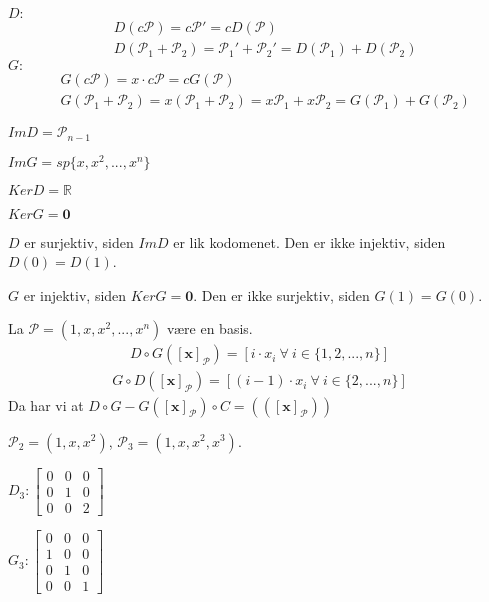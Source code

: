 \documentclass[11pt, a4paper, norsk]{NTNUoving}
\begin{document}
\begin{oppgave}[4]
\begin{punkt}
    $D:$
    \begin{align*}
        &D(c\mathcal{P})=c\mathcal{P}'=cD(\mathcal{P})
        \\&D(\mathcal{P}_1+\mathcal{P}_2)=\mathcal{P}_1'+\mathcal{P}_2'=D(\mathcal{P}_1)+D(\mathcal{P}_2)
    \end{align*}
    $G:$
    \begin{align*}
        &G(c\mathcal{P})=x\cdot c\mathcal{P} = cG(\mathcal{P})
        \\&G(\mathcal{P}_1+\mathcal{P}_2)=x(\mathcal{P}_1+\mathcal{P}_2)=x\mathcal{P}_1+x\mathcal{P}_2=G(\mathcal{P}_1)+G(\mathcal{P}_2)
    \end{align*}
    \end{punkt}
    \begin{punkt}
        $ImD=\mathcal{P}_{n-1}$
        
        $ImG=sp\{x, x^2, ... , x^n\}$
        
        $KerD=\mathbb{R}$
        
        $KerG=\textbf{0}$
    \end{punkt}
    \begin{punkt}
        $D$ er surjektiv, siden $ImD$ er lik kodomenet. Den er ikke injektiv, siden $D(0)=D(1)$.
        
        $G$ er injektiv, siden $KerG=\textbf{0}$. Den er ikke surjektiv, siden $G(1)=G(0)$.
    \end{punkt}
    \begin{punkt}
    La $\mathcal{P}=(1, x, x^2, ... , x^n)$ være en basis.
        \begin{align*}
            D\circ G(\mathcal{[\textbf{x}]_\mathcal{P}})=[i\cdot x_i\: \forall\: i\in \{1, 2,..., n\}]
        \end{align*}
        \begin{align*}
            G\circ D(\mathcal{[\textbf{x}]_\mathcal{P}})=[(i-1)\cdot x_i\: \forall\: i\in \{2,..., n\}]
        \end{align*}
        Da har vi at $D\circ G-G(\mathcal{[\textbf{x}]_\mathcal{P}})\circ C=((\mathcal{[\textbf{x}]_\mathcal{P}}))$
    \end{punkt}
    \begin{punkt}
        $\mathcal{P}_2=(1, x, x^2)$, $\mathcal{P}_3=(1, x, x^2, x^3)$.
        
        $D_3:\begin{bmatrix}0 & 0 & 0\\0 & 1 & 0\\0 & 0 & 2 \end{bmatrix}$
        
        $G_3:\begin{bmatrix}0&0&0\\1 & 0 & 0 \\0 & 1 &  0\\0 & 0 & 1 \end{bmatrix}$
    \end{punkt}
\end{oppgave}
\end{document}
